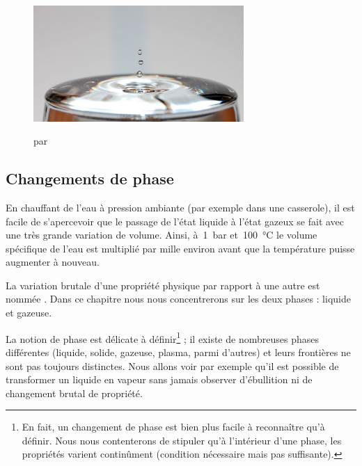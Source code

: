 		\begin{figure}
			\begin{center}
				\includegraphics[width=8cm]{images/photo_liquide.jpg}
			\end{center}
				{ \ccby par }
  		\label{fig_oocestjoli}
		\end{figure}
	
	\subsection{Changements de phase}
	
		En chauffant de l’eau à pression ambiante (par exemple dans une casserole), il est facile de s’apercevoir que le passage de l’état liquide à l’état gazeux se fait avec une très grande variation de volume. Ainsi, à~\SI{1}{\bar} et~\SI{100}{\degreeCelsius} le volume spécifique de l’eau est multiplié par mille environ avant que la température puisse augmenter à nouveau.
		
		La variation brutale d’une propriété physique par rapport à une autre est nommée . Dans ce chapitre nous nous concentrerons sur les deux phases : liquide et gazeuse.
		
		La notion de phase est délicate à définir\footnote{En fait, un changement de phase est bien plus facile à reconnaître qu’à définir. Nous nous contenterons de stipuler qu’à l’intérieur d’une phase, les propriétés varient continûment (condition nécessaire mais pas suffisante).} ; il existe de nombreuses phases différentes (liquide, solide, gazeuse, plasma, parmi d’autres) et leurs frontières ne sont pas toujours distinctes. Nous allons voir par exemple qu’il est possible de transformer un liquide en vapeur sans jamais observer d’ébullition ni de changement brutal de propriété.
		
